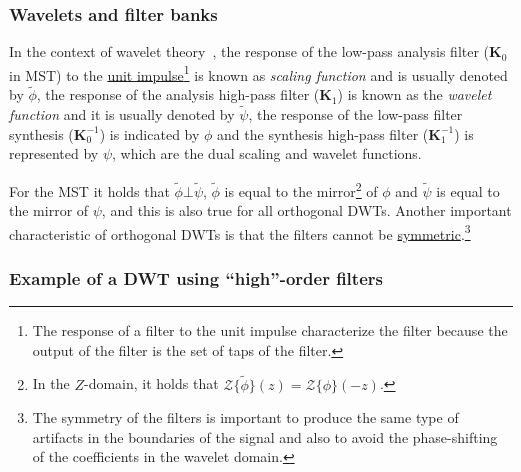
\subsubsection{Wavelets and filter banks}

In the context of wavelet theory~\cite{burrus2013wavelets}, the
response of the low-pass analysis filter (${\mathbf K}_0$ in MST)
to the
\href{https://en.wikipedia.org/?title=Unit_impulse&redirect=no}{unit
  impulse}\footnote{The response of a filter to the unit impulse
characterize the filter because the output of the filter is the set of
taps of the filter.} is known as \emph{scaling function} and is
usually denoted by $\tilde\phi$, the response of the analysis
high-pass filter (${\mathbf K}_1$) is known as the \emph{wavelet
function} and it is usually denoted by $\tilde\psi$, the response of
the low-pass filter synthesis (${\mathbf K}^{-1}_0$) is indicated by
$\phi$ and the synthesis high-pass filter (${\mathbf K}^{-1}_1$) is
represented by $\psi$, which are the dual scaling and wavelet functions.

For the MST it holds that $\tilde\phi\bot\tilde\psi$, $\tilde\phi$ is
equal to the mirror\footnote{In the $Z$-domain, it holds that
  ${\mathcal Z}\{\tilde\phi\}(z)={\mathcal Z}\{\phi\}(-z)$.} of $\phi$
and $\tilde\psi$ is equal to the mirror of $\psi$, and this is also
true for all orthogonal DWTs. Another important characteristic of
orthogonal DWTs is that the filters cannot be
\href{https://en.wikipedia.org/wiki/Symmetry}{symmetric}.\footnote{The
  symmetry of the filters is important to produce the same type of
  artifacts in the boundaries of the signal and also to avoid the
  phase-shifting of the coefficients in the wavelet domain.}



\subsubsection{Example of a DWT using ``high''-order filters}

